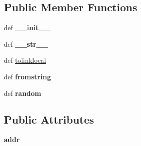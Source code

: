 \subsection*{Public Member Functions}
\begin{DoxyCompactItemize}
\item 
\hypertarget{classcore_1_1misc_1_1ipaddr_1_1_mac_addr_ab217172baf023a8ca7d83018b53a3ce0}{def {\bfseries \+\_\+\+\_\+init\+\_\+\+\_\+}}\label{classcore_1_1misc_1_1ipaddr_1_1_mac_addr_ab217172baf023a8ca7d83018b53a3ce0}

\item 
\hypertarget{classcore_1_1misc_1_1ipaddr_1_1_mac_addr_a1a3a578acf984bbdde235df419547697}{def {\bfseries \+\_\+\+\_\+str\+\_\+\+\_\+}}\label{classcore_1_1misc_1_1ipaddr_1_1_mac_addr_a1a3a578acf984bbdde235df419547697}

\item 
def \hyperlink{classcore_1_1misc_1_1ipaddr_1_1_mac_addr_a2a78e8a8683a85de0fe897cc85798a9e}{tolinklocal}
\item 
\hypertarget{classcore_1_1misc_1_1ipaddr_1_1_mac_addr_ab146ff2b2fdfbdd2f6b1dc1ec9becadf}{def {\bfseries fromstring}}\label{classcore_1_1misc_1_1ipaddr_1_1_mac_addr_ab146ff2b2fdfbdd2f6b1dc1ec9becadf}

\item 
\hypertarget{classcore_1_1misc_1_1ipaddr_1_1_mac_addr_a8ee481ed9cd05e1c41af7a2a576f0efb}{def {\bfseries random}}\label{classcore_1_1misc_1_1ipaddr_1_1_mac_addr_a8ee481ed9cd05e1c41af7a2a576f0efb}

\end{DoxyCompactItemize}
\subsection*{Public Attributes}
\begin{DoxyCompactItemize}
\item 
\hypertarget{classcore_1_1misc_1_1ipaddr_1_1_mac_addr_a12d81dfcc6cb0575044ca4ea26fb63ca}{{\bfseries addr}}\label{classcore_1_1misc_1_1ipaddr_1_1_mac_addr_a12d81dfcc6cb0575044ca4ea26fb63ca}

\end{DoxyCompactItemize}


